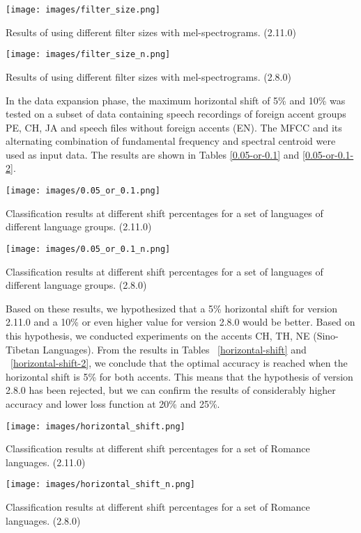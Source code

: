 \documentclass[ams]{U-AizuGT}
\begin{document}
\begin{table}[h]
    \centering
    \texttt{[image: images/filter\_size.png]}
    \caption{Results of using different filter sizes with mel-spectrograms. (2.11.0)}
    \label{filter-size}
\end{table}
\begin{table}[h]
    \centering
    \texttt{[image: images/filter\_size\_n.png]}
    \caption{Results of using different filter sizes with mel-spectrograms. (2.8.0)}
    \label{filter-size-2}
\end{table}

In the data expansion phase, the maximum horizontal shift of 5\% and 10\% was tested on a subset of data containing speech recordings of foreign accent groups {PE, CH, JA} and speech files without foreign accents (EN). The MFCC and its alternating combination of fundamental frequency and spectral centroid were used as input data. The results are shown in Tables \ref{0.05-or-0.1} and \ref{0.05-or-0.1-2}.
\begin{table}[h]
    \centering
    \texttt{[image: images/0.05\_or\_0.1.png]}
    \caption{Classification results at different shift percentages for a set of languages of different language groups. (2.11.0)}
    \label{0.05-or-0.1}
\end{table}
\begin{table}[h]
    \centering
    \texttt{[image: images/0.05\_or\_0.1\_n.png]}
    \caption{Classification results at different shift percentages for a set of languages of different language groups. (2.8.0)}
    \label{0.05-or-0.1-2}
\end{table}

Based on these results, we hypothesized that a 5\% horizontal shift for version 2.11.0 and a 10\% or even higher value for version 2.8.0 would be better. Based on this hypothesis, we conducted experiments on the accents {CH, TH, NE} (Sino-Tibetan Languages). From the results in Tables ~\ref{horizontal-shift} and ~\ref{horizontal-shift-2}, we conclude that the optimal accuracy is reached when the horizontal shift is 5\% for both accents. This means that the hypothesis of version 2.8.0 has been rejected, but we can confirm the results of considerably higher accuracy and lower loss function at 20\% and 25\%.

\begin{table}[h]
    \centering
    \texttt{[image: images/horizontal\_shift.png]}
    \caption{Classification results at different shift percentages for a set of Romance languages. (2.11.0)}
    \label{horizontal-shift}
\end{table}
\begin{table}[h]
    \centering
    \texttt{[image: images/horizontal\_shift\_n.png]}
    \caption{Classification results at different shift percentages for a set of Romance languages. (2.8.0)}
    \label{horizontal-shift-2}
\end{table}
\end{document}
